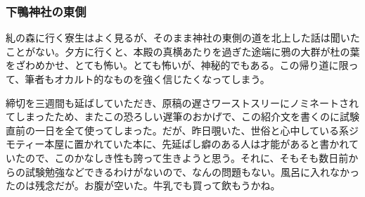 \begin{multicols}{2}
\subsubsection{下鴨神社の東側}
\noindent
\scalebox{0.88}{朝★☆☆☆☆昼★★★★★夜★☆☆☆☆危険度★★★★★}
\baselineskip
糺の森に行く寮生はよく見るが、そのまま神社の東側の道を北上した話は聞いたことがない。夕方に行くと、本殿の真横あたりを過ぎた途端に鴉の大群が杜の葉をざわめかせ、とても怖い。とても怖いが、神秘的でもある。この帰り道に限って、筆者もオカルト的なものを強く信じたくなってしまう。

\end{multicols}


締切を三週間も延ばしていただき、原稿の遅さワーストスリーにノミネートされてしまったため、またこの恐ろしい遅筆のおかげで、この紹介文を書くのに試験直前の一日を全て使ってしまった。だが、昨日覗いた、世俗と心中している系ジモティー本屋に置かれていた本に、先延ばし癖のある人は才能があると書かれていたので、このかなしき性も誇って生きようと思う。それに、そもそも数日前からの試験勉強などできるわけがないので、なんの問題もない。風呂に入れなかったのは残念だが。お腹が空いた。牛乳でも買って飲もうかね。




